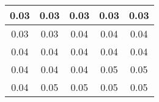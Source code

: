 \begin{large}\begin{tabular}{|c|c|c|c|c|}
\hline
0.03&0.03&0.03&0.03&0.03\\\hline
0.03&0.03&0.04&0.04&0.04\\\hline
0.04&0.04&0.04&0.04&0.04\\\hline
0.04&0.04&0.04&0.05&0.05\\\hline
0.04&0.05&0.05&0.05&0.05\\\hline
\end{tabular}
\end{large}